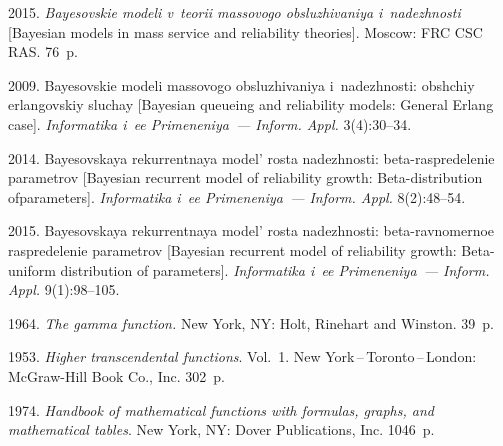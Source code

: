   \begin{multicols}{2}

\renewcommand{\bibname}{\protect\rmfamily References}

{\small\frenchspacing
 {%
 \begin{thebibliography}{9}


 2015. \textit{Bayesovskie modeli 
v~teorii massovogo obsluzhivaniya i~nadezhnosti} 
[Bayesian models in mass service and reliability theories]. Moscow: FRC
CSC RAS. 76~p.

2009. Bayesovskie modeli massovogo obsluzhivaniya i~nadezhnosti: 
obshchiy erlangovskiy sluchay [Bayesian queueing and reliability models: 
General Erlang case]. \textit{Informatika i~ee Primeneniya~--- Inform. Appl.}
3(4):30--34.

2014. Bayesovskaya rekurrentnaya mo\-del' ros\-ta na\-dezh\-nosti: beta-raspredelenie 
pa\-ra\-met\-rov [Bayesian recurrent model of reliability growth: 
Beta-distribution of\linebreak parameters]. \textit{Informatika i~ee Primeneniya~--- 
Inform. Appl.} 8(2):48--54.

 2015.
Bayesovskaya rekurrentnaya mo\-del' ros\-ta na\-dezh\-nosti: beta-ravnomernoe
raspredelenie pa\-ra\-met\-rov [Bayesian recurrent model of reliability growth: 
Beta-uniform distribution of parameters].
\textit{Informatika i~ee Primeneniya~--- Inform. Appl.} 9(1):98--105.

 1964. \textit{The gamma function.} New York, NY: 
Holt, Rinehart and Winston. 39~p. 

 1953. 
\textit{Higher transcendental functions}. Vol.~1. New York\,--\,Toronto\,--\,London: 
McGraw-Hill Book Co., Inc. 302~p.

1974. \textit{Handbook of mathematical functions with formulas, graphs, and mathematical tables}. 
New York, NY: Dover Publications, Inc. 1046~p.
\end{thebibliography}

 }
 }

\end{multicols}

